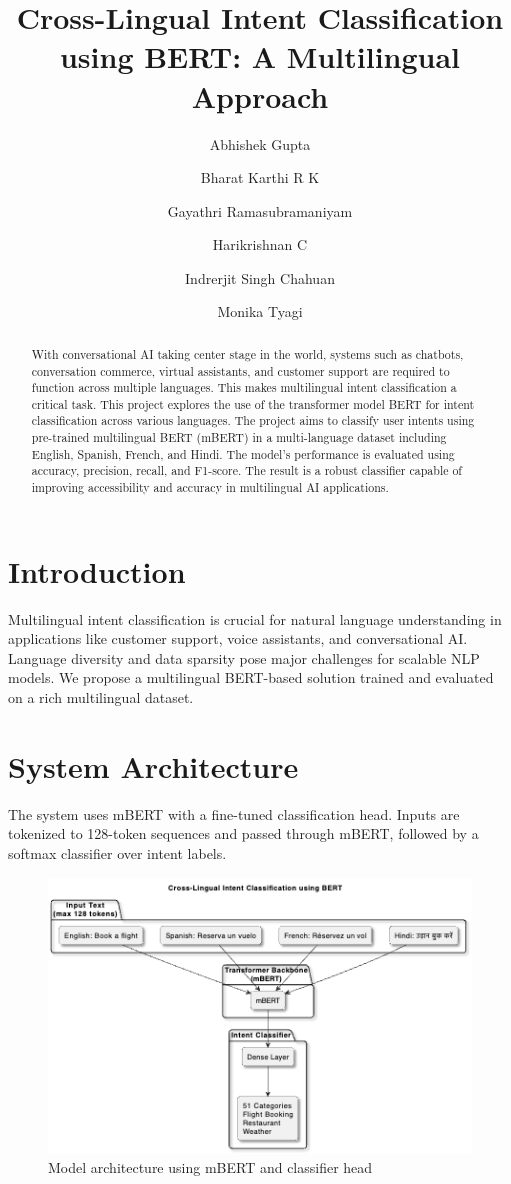 \documentclass{ecai}
\title{Cross-Lingual Intent Classification using BERT: A Multilingual Approach}
\author{
Abhishek Gupta \and
Bharat Karthi R K \and
Gayathri Ramasubramaniyam \and
Harikrishnan C \and
Indrerjit Singh Chahuan \and
Monika Tyagi
\institute{Team from DA 225o Deep Learning (Summer 2025), Indian Institute of Science}
}
\begin{document}
\maketitle

\begin{abstract}
With conversational AI taking center stage in the world, systems such as chatbots, conversation commerce, virtual assistants, and customer support are required to function across multiple languages. This makes multilingual intent classification a critical task. This project explores the use of the transformer model BERT for intent classification across various languages. The project aims to classify user intents using pre-trained multilingual BERT (mBERT) in a multi-language dataset including English, Spanish, French, and Hindi. The model's performance is evaluated using accuracy, precision, recall, and F1-score. The result is a robust classifier capable of improving accessibility and accuracy in multilingual AI applications.
\end{abstract}

\section{Introduction}
Multilingual intent classification is crucial for natural language understanding in applications like customer support, voice assistants, and conversational AI. Language diversity and data sparsity pose major challenges for scalable NLP models. We propose a multilingual BERT-based solution trained and evaluated on a rich multilingual dataset.

\section{System Architecture}
The system uses mBERT with a fine-tuned classification head. Inputs are tokenized to 128-token sequences and passed through mBERT, followed by a softmax classifier over intent labels.

\begin{figure}[h]
\centering
\includegraphics[width=0.8\linewidth]{architecture.png}
\caption{Model architecture using mBERT and classifier head}
\end{figure}
\end{document}
